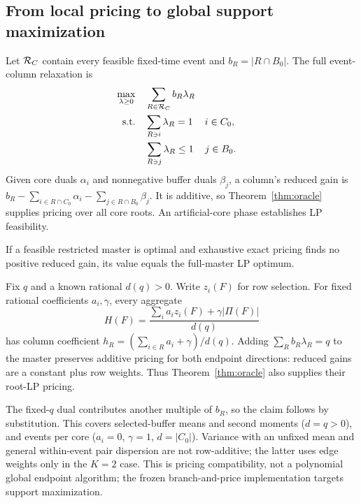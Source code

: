\subsection{From local pricing to global support maximization}
Let $\mathcal R_C$ contain every feasible fixed-time event and
$b_R=|R\cap B_0|$. The full event-column relaxation is
\begin{align}
\max_{\lambda\ge0}\quad &\sum_{R\in\mathcal R_C}b_R\lambda_R
\label{eq:masterobj}\\
\text{s.t.}\quad &\sum_{R\ni i}\lambda_R=1 &&i\in C_0,
\label{eq:coremaster}\\
&\sum_{R\ni j}\lambda_R\le1 &&j\in B_0.
\label{eq:buffermaster}
\end{align}
Given core duals $\alpha_i$ and nonnegative buffer duals $\beta_j$, a
column's reduced gain is
$b_R-\sum_{i\in R\cap C_0}\alpha_i-\sum_{j\in R\cap B_0}\beta_j$.
It is additive, so Theorem~\ref{thm:oracle} supplies pricing over all core
roots. An artificial-core phase establishes LP feasibility.

\begin{proposition}
\label{prop:cg}
If a feasible restricted master is optimal and exhaustive exact pricing
finds no positive reduced gain, its value equals the full-master LP optimum.
\end{proposition}

\begin{proposition}
\label{prop:aggregateclass}
Fix $q$ and a known rational $d(q)>0$. Write $z_i(F)$ for row selection. For fixed
rational coefficients $a_i,\gamma$, every aggregate
\[
 H(F)=\frac{\sum_i a_i z_i(F)+\gamma|\Pi(F)|}{d(q)}
\]
has column coefficient $h_R=(\sum_{i\in R}a_i+\gamma)/d(q)$.
Adding $\sum_R b_R\lambda_R=q$ to the master preserves additive pricing for
both endpoint directions: reduced gains are a constant plus row weights.
Thus Theorem~\ref{thm:oracle} also supplies their root-LP pricing.
\end{proposition}
The fixed-$q$ dual contributes another multiple of $b_R$, so the claim follows
by substitution. This covers selected-buffer means and second moments
($d=q>0$), and events per core ($a_i=0$, $\gamma=1$, $d=|C_0|$).
Variance with an unfixed mean and general within-event pair dispersion are
not row-additive; the latter uses edge weights only in the $K=2$ case.
This is pricing compatibility, not a polynomial global endpoint algorithm;
the frozen branch-and-price implementation targets support maximization.

